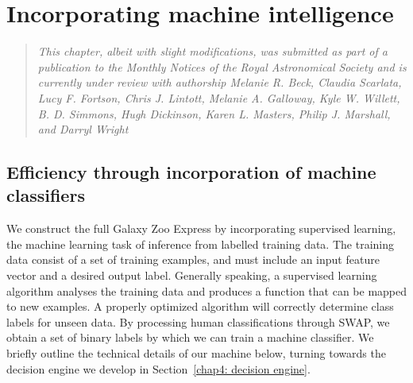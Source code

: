 
\chapter{Incorporating machine intelligence}
\label{chap:4}

\begin{quote}
\emph{This chapter, albeit with slight modifications, was submitted as part of a publication to the Monthly Notices of the Royal Astronomical Society and is currently under review with authorship Melanie R. Beck, Claudia Scarlata, Lucy F. Fortson, Chris J. Lintott, Melanie A. Galloway, Kyle W. Willett, B. D. Simmons, Hugh Dickinson, Karen L. Masters, Philip J. Marshall, and Darryl Wright}\\
\end{quote}

\section{Efficiency through incorporation of machine classifiers} \label{chap4: machine}

We construct the full Galaxy Zoo Express by incorporating supervised 
learning, the machine learning task of inference from labelled training data. 
The training data consist of a set of training examples, and must include
an input feature vector and a desired output label.  Generally speaking,
a supervised learning algorithm analyses the training data and produces a 
function that can be mapped to new examples. A properly optimized algorithm will 
correctly determine class labels for unseen data. By processing human classifications 
through SWAP, we obtain a set of binary labels by which we can train a machine 
classifier. We briefly outline the technical details of our machine below,  turning
towards the decision engine we develop in Section~\ref{chap4: decision engine}. 




